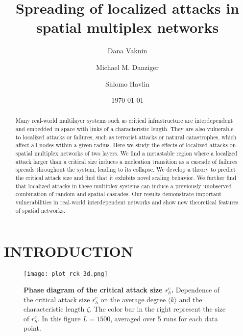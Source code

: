 \documentclass[twocolumn,noshowpacs,pre,preprintnumbers,superscriptaddress,amsmath,amssymb,floatfix]{revtex4}
\newcommand{\kk}{\langle k \rangle}
\begin{document}
	
	\title{Spreading of localized attacks in spatial multiplex networks}
	\author{Dana Vaknin}
	\author{Michael M. Danziger} 
	\author{Shlomo Havlin}
	\date{\today}
	
	\begin{abstract}
		
		Many real-world multilayer systems such as critical infrastructure are interdependent and embedded in space with links of a characteristic length.
		They are also vulnerable to localized attacks or failures, such as terrorist attacks or natural catastrophes, which affect all nodes within a given radius.
		Here we study the effects of localized attacks on spatial multiplex networks of two layers.
		We find a metastable region where a localized attack larger than a critical size induces a nucleation transition as a cascade of failures spreads throughout the system, leading to its collapse.
		We develop a theory to predict the critical attack size and find that it exhibits novel scaling behavior.
		We further find that localized attacks in these multiplex systems can induce a previously unobserved combination of random and spatial cascades.
		Our results demonstrate important vulnerabilities in real-world interdependent networks and show new theoretical features of spatial networks.
	\end{abstract}
	\maketitle
	
	\section{INTRODUCTION}
	\begin{figure}
		\centering
		\texttt{[image: plot\_rck\_3d.png]}
		\caption{\textbf{Phase diagram of the critical attack size $r_h^c$.}
			Dependence of the critical attack size $r_h^c$ on the average degree $\kk$ and the characteristic length $\zeta$. The color bar in the right represent the size of $r_h^c$.
			In this figure $L = 1500$, averaged over 5 runs for each data point.}	
		\label{fig:rck}
	\end{figure}
	
\end{document}
